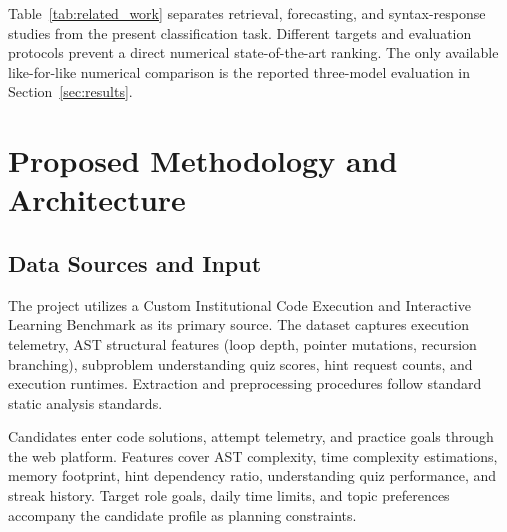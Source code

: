 \documentclass[conference]{IEEEtran}
\begin{document}
Table~\ref{tab:related_work} separates retrieval, forecasting, and syntax-response studies from the present classification task. Different targets and evaluation protocols prevent a direct numerical state-of-the-art ranking. The only available like-for-like numerical comparison is the reported three-model evaluation in Section~\ref{sec:results}.

\section{Proposed Methodology and Architecture}

\subsection{Data Sources and Input}
The project utilizes a Custom Institutional Code Execution and Interactive Learning Benchmark as its primary source. The dataset captures execution telemetry, AST structural features (loop depth, pointer mutations, recursion branching), subproblem understanding quiz scores, hint request counts, and execution runtimes. Extraction and preprocessing procedures follow standard static analysis standards.

Candidates enter code solutions, attempt telemetry, and practice goals through the web platform. Features cover AST complexity, time complexity estimations, memory footprint, hint dependency ratio, understanding quiz performance, and streak history. Target role goals, daily time limits, and topic preferences accompany the candidate profile as planning constraints.
\end{document}
